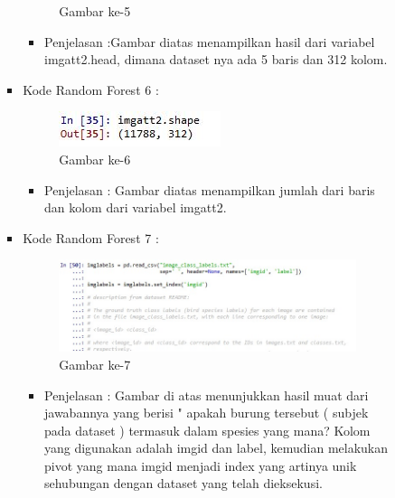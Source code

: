 \begin{enumerate}
\begin{itemize}
\begin{itemize}
\begin{itemize}
\begin{figure}[ht]
\caption{Gambar ke-5}
\label{contoh}
\end{figure}
\par
\begin{itemize}
\item Penjelasan :Gambar diatas menampilkan hasil dari variabel imgatt2.head, dimana dataset nya ada 5 baris dan 312 kolom.
\par
\par
\end{itemize}
\item Kode Random Forest 6 :
\par
\begin{figure}[ht]
\centering
\includegraphics[scale=0.7]{figures/hmm/cod6.jpg}
\caption{Gambar ke-6}
\label{contoh}
\end{figure}
\par
\begin{itemize}
\item Penjelasan : Gambar diatas menampilkan jumlah dari baris dan kolom dari variabel imgatt2.
\par
\par
\end{itemize}
\item Kode Random Forest 7 :
\par
\begin{figure}[ht]
\centering
\includegraphics[scale=0.7]{figures/hmm/cod7.jpeg}
\caption{Gambar ke-7}
\label{contoh}
\end{figure}
\par
\begin{itemize}
\item Penjelasan : Gambar di atas menunjukkan hasil muat dari jawabannya yang berisi " apakah burung tersebut ( subjek pada dataset ) termasuk dalam spesies yang mana? Kolom yang digunakan adalah imgid dan label, kemudian melakukan pivot yang mana imgid menjadi index yang artinya unik sehubungan dengan dataset yang telah dieksekusi.

\end{itemize}
\end{itemize}
\end{itemize}
\end{itemize}
\end{enumerate}
